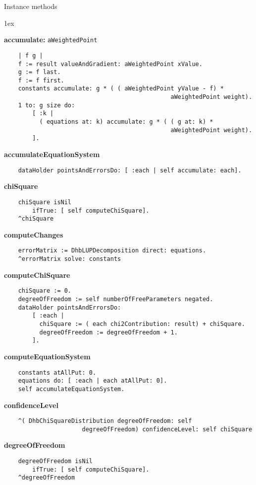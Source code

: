 Instance methods
{\parskip 1ex\par\noindent}
{\bf accumulate:} {\tt aWeightedPoint}
\begin{verbatim}
    | f g |
    f := result valueAndGradient: aWeightedPoint xValue.
    g := f last.
    f := f first.
    constants accumulate: g * ( ( aWeightedPoint yValue - f) * 
                                               aWeightedPoint weight).
    1 to: g size do:
        [ :k |
          ( equations at: k) accumulate: g * ( ( g at: k) * 
                                               aWeightedPoint weight).
        ].

\end{verbatim}
{\bf accumulateEquationSystem}
\begin{verbatim}
    dataHolder pointsAndErrorsDo: [ :each | self accumulate: each].

\end{verbatim}
{\bf chiSquare}
\begin{verbatim}
    chiSquare isNil
        ifTrue: [ self computeChiSquare].
    ^chiSquare

\end{verbatim}
{\bf computeChanges}
\begin{verbatim}
    errorMatrix := DhbLUPDecomposition direct: equations.
    ^errorMatrix solve: constants

\end{verbatim}
{\bf computeChiSquare}
\begin{verbatim}
    chiSquare := 0.
    degreeOfFreedom := self numberOfFreeParameters negated.
    dataHolder pointsAndErrorsDo:
        [ :each |
          chiSquare := ( each chi2Contribution: result) + chiSquare.
          degreeOfFreedom := degreeOfFreedom + 1.
        ].

\end{verbatim}
{\bf computeEquationSystem}
\begin{verbatim}
    constants atAllPut: 0.
    equations do: [ :each | each atAllPut: 0].
    self accumulateEquationSystem.

\end{verbatim}
{\bf confidenceLevel}
\begin{verbatim}
    ^( DhbChiSquareDistribution degreeOfFreedom: self 
                      degreeOfFreedom) confidenceLevel: self chiSquare

\end{verbatim}
{\bf degreeOfFreedom}
\begin{verbatim}
    degreeOfFreedom isNil
        ifTrue: [ self computeChiSquare].
    ^degreeOfFreedom

\end{verbatim}
